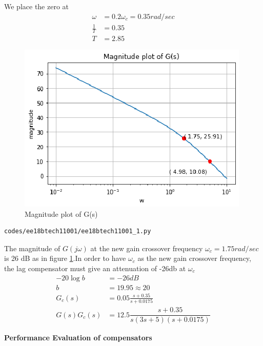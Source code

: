 We place the zero at 
\begin{align} 
   \omega &= 0.2\omega_{c} = 0.35 rad/sec 
   \\
   \frac{1}{T} &= 0.35
   \\
   T &= 2.85
\end{align}
\begin{figure}[!ht]
\centering
    \includegraphics[width=\columnwidth]{./figs/ee18btech11001/ee18btech11001_2.eps}
  \caption{Magnitude plot of G(s)}
  \label{fig:ee18btech11001_fig3}
\end{figure}
\begin{lstlisting}
codes/ee18btech11001/ee18btech11001_1.py
\end{lstlisting}

The magnitude of $G(j\omega)$ at the new gain crossover frequency  $\omega_{c} = 1.75 rad/sec$ is 26 dB as in figure \ref{fig:ee18btech11001_fig3}.In order to have $\omega_{c}$  as the new gain crossover frequency, the lag compensator
must give an attenuation of -26db at $\omega_{c}$
\begin{align}
    -20 \log{b} &= -26dB
    \\
    b &= 19.95 \approx 20
    \\
    G_{c}(s) &=  0.05\frac{s + 0.35}{s + 0.0175}
    \\
    G(s)G_{c}(s) &= 12.5 \dfrac{s+0.35}{s(3s+5)(s+0.0175)} \label{eq:ee18btech11001_12}
\end{align}


\textbf{Performance Evaluation of compensators}


